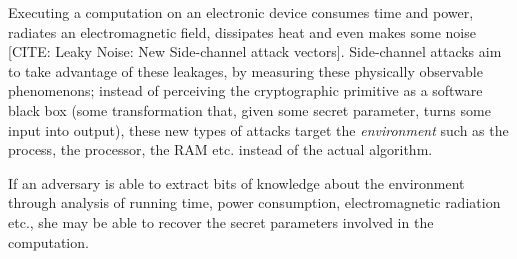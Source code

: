 Executing a computation on an electronic device consumes time and power, radiates an electromagnetic field, dissipates heat and even makes some noise [CITE: Leaky Noise: New Side-channel attack vectors]. 
Side-channel attacks aim to take advantage of these leakages, by measuring these physically observable phenomenons; instead of perceiving the cryptographic primitive as a software black box (some transformation that, given some secret parameter, turns some input into output), these new types of attacks target the \emph{environment} such as the process, the processor, the RAM etc. instead of the actual algorithm.

If an adversary is able to extract bits of knowledge about the environment through analysis of running time, power consumption, electromagnetic radiation etc., she may be able to recover the secret parameters involved in the computation.


